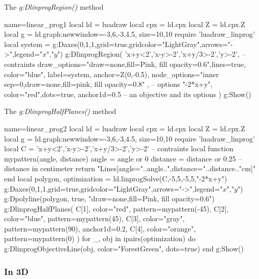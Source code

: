 \begin{demo}{The \emph{g:DlinprogRegion()} method}
\begin{luadraw}{name=linear_prog1}
local ld = luadraw
local cpx = ld.cpx
local Z = ld.cpx.Z
local g = ld.graph:new{window={-3,6,-3,4.5}, size={10,10}}
require 'luadraw_linprog'
local system = 
g:Daxes({0,1,1},{grid=true,gridcolor="LightGray",arrows="->",legend={"$x$","$y$"}})
g:DlinprogRegion(
    {'x+y<2','x-y>-2','x+y/3>-2','y>-2'}, -- contraints
    {draw_options="draw=none,fill=Pink, fill opacity=0.6",lines=true, color="blue", label=system, anchor=Z(0,-0.5),
    node_options="inner sep=0,draw=none,fill=pink, fill opacity=0.8" }, -- options
    {"-2*x+y"}, {color="red",dots=true, anchor1d=0.5} -- an objective and its options
    )
g:Show()
\end{luadraw}
\end{demo}

\begin{demo}{The \emph{g:DlinprogHalfPlanes()} method}
\begin{luadraw}{name=linear_prog2}
local ld = luadraw
local cpx = ld.cpx
local Z = ld.cpx.Z
local g = ld.graph:new{window={-3,6,-3,4.5}, size={10,10}}
require 'luadraw_linprog'
local C = {'x+y<2','x-y>-2','x+y/3>-2','y>-2'} -- contraints
local function mypattern(angle, distance)
    angle = angle or 0
    distance = distance or 0.25 -- distance in centimeter
    return "{Lines[angle="..angle..",distance="..distance.."cm]}"
end
local polygon, optimization = ld.linprogSolve(C,-5,5,-5,5,{"-2*x+y"})
g:Daxes({0,1,1},{grid=true,gridcolor="LightGray",arrows="->",legend={"$x$","$y$"}})
g:Dpolyline(polygon, true, "draw=none,fill=Pink, fill opacity=0.6")
g:DlinprogHalfPlanes(
    C[1], {color="red", pattern=mypattern(-45)},
    C[2], {color="blue", pattern=mypattern(45)},
    C[3], {color="gray", pattern=mypattern(90), anchor1d=0.2},
    C[4], {color="orange", pattern=mypattern(0)}
    )
for _, obj in ipairs(optimization) do
    g:DlinprogObjectiveLine(obj, {color="ForestGreen", dots=true})
end
g:Show()
\end{luadraw}
\end{demo}

\subsubsection{In 3D}

